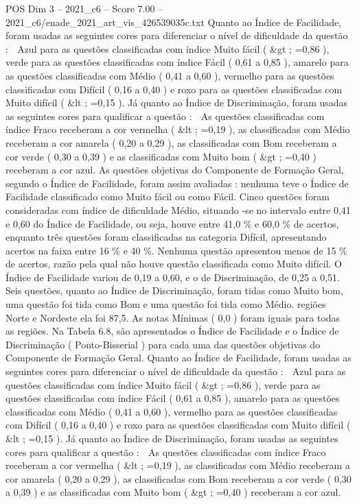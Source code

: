 \begin{textsample}{POS Dim 3 – 2021\_c6 – Score 7.00 – 2021\_c6/enade\_2021\_art\_vis\_426539035c.txt}
Quanto ao Índice de Facilidade, foram usadas as seguintes cores para diferenciar o nível de dificuldade da questão :  Azul para as questões classificadas com índice Muito fácil ( \&gt ; =0,86 ), verde para as questões classificadas com índice Fácil ( 0,61 a 0,85 ), amarelo para as questões classificadas com Médio ( 0,41 a 0,60 ), vermelho para as questões classificadas com Difícil ( 0,16 a 0,40 ) e roxo para as questões classificadas com Muito difícil ( \&lt ; =0,15 ).
Já quanto ao Índice de Discriminação, foram usadas as seguintes cores para qualificar a questão :  As questões classificadas com índice Fraco receberam a cor vermelha ( \&lt ; =0,19 ), as classificadas com Médio receberam a cor amarela ( 0,20 a 0,29 ), as classificadas com Bom receberam a cor verde ( 0,30 a 0,39 ) e as classificadas com Muito bom ( \&gt ; =0,40 ) receberam a cor azul.
As questões objetivas do Componente de Formação Geral, segundo o Índice de Facilidade, foram assim avaliadas : nenhuma teve o Índice de Facilidade classificado como Muito fácil ou como Fácil.
Cinco questões foram consideradas com índice de dificuldade Médio, situando -se no intervalo entre 0,41 e 0,60 do Índice de Facilidade, ou seja, houve entre 41,0 \% e 60,0 \% de acertos, enquanto três questões foram classificadas na categoria Difícil, apresentando acertos na faixa entre 16 \% e 40 \%.
Nenhuma questão apresentou menos de 15 \% de acertos, razão pela qual não houve questão classificada como Muito difícil.
O Índice de Facilidade variou de 0,19 a 0,60, e o de Discriminação, de 0,25 a 0,51.
Seis questões, quanto ao Índice de Discriminação, foram tidas como Muito bom, uma questão foi tida como Bom e uma questão foi tida como Médio. regiões Norte e Nordeste ela foi 87,5.
As notas Mínimas ( 0,0 ) foram iguais para todas as regiões.
Na Tabela 6.8, são apresentados o Índice de Facilidade e o Índice de Discriminação ( Ponto-Bisserial ) para cada uma das questões objetivas do Componente de Formação Geral.
Quanto ao Índice de Facilidade, foram usadas as seguintes cores para diferenciar o nível de dificuldade da questão :  Azul para as questões classificadas com índice Muito fácil ( \&gt ; =0,86 ), verde para as questões classificadas com índice Fácil ( 0,61 a 0,85 ), amarelo para as questões classificadas com Médio ( 0,41 a 0,60 ), vermelho para as questões classificadas com Difícil ( 0,16 a 0,40 ) e roxo para as questões classificadas com Muito difícil ( \&lt ; =0,15 ).
Já quanto ao Índice de Discriminação, foram usadas as seguintes cores para qualificar a questão :  As questões classificadas com índice Fraco receberam a cor vermelha ( \&lt ; =0,19 ), as classificadas com Médio receberam a cor amarela ( 0,20 a 0,29 ), as classificadas com Bom receberam a cor verde ( 0,30 a 0,39 ) e as classificadas com Muito bom ( \&gt ; =0,40 ) receberam a cor azul.

\end{textsample}
